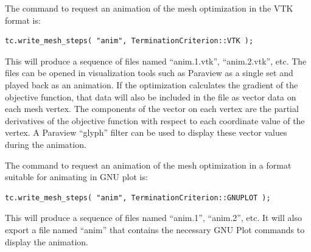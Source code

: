 The command to request an animation of the mesh optimization in the VTK format is:
\begin{lstlisting}
tc.write_mesh_steps( "anim", TerminationCriterion::VTK );
\end{lstlisting}
This will produce a sequence of files named ``anim.1.vtk'', ``anim.2.vtk'', etc.  The files can be opened in visualization tools such as Paraview as a single set and played back as an animation.  If the optimization calculates the gradient of the objective function, that data will also be included in the file as vector data on each mesh vertex.  The components of the vector on each vertex are the partial derivatives of the objective function with respect to each coordinate value of the vertex.  A Paraview ``glyph'' filter can be used to display these vector values during the animation.


The command to request an animation of the mesh optimization in a format suitable for animating in GNU plot is:
\begin{lstlisting}
tc.write_mesh_steps( "anim", TerminationCriterion::GNUPLOT );
\end{lstlisting}
This will produce a sequence of files named ``anim.1'', ``anim.2'', etc.  It will also export a file named ``anim'' that contains the necessary GNU Plot commands to display the animation.


